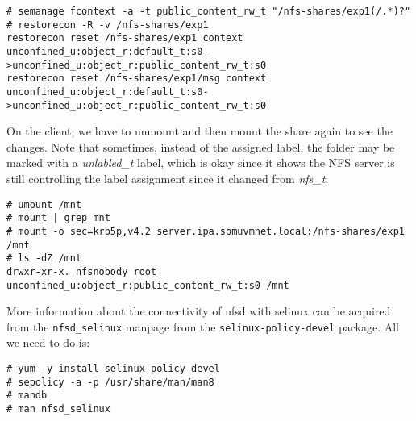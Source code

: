 \vspace{-15pt}
\begin{verbatim}
# semanage fcontext -a -t public_content_rw_t "/nfs-shares/exp1(/.*)?"
# restorecon -R -v /nfs-shares/exp1
restorecon reset /nfs-shares/exp1 context unconfined_u:object_r:default_t:s0->unconfined_u:object_r:public_content_rw_t:s0
restorecon reset /nfs-shares/exp1/msg context unconfined_u:object_r:default_t:s0->unconfined_u:object_r:public_content_rw_t:s0
\end{verbatim}
\vspace{-10pt}	

\noindent
On the client, we have to unmount and then mount the share again to see the changes. Note that sometimes, instead of the assigned label, the folder may be marked with a \textit{unlabled\_t} label, which is okay since it shows the NFS server is still controlling the label assignment since it changed from \textit{nfs\_t}:

\vspace{-15pt}
\begin{verbatim}
# umount /mnt
# mount | grep mnt
# mount -o sec=krb5p,v4.2 server.ipa.somuvmnet.local:/nfs-shares/exp1 /mnt
# ls -dZ /mnt
drwxr-xr-x. nfsnobody root unconfined_u:object_r:public_content_rw_t:s0 /mnt
\end{verbatim}
\vspace{-10pt}	

\noindent
More information about the connectivity of nfsd with selinux can be acquired from the \verb|nfsd_selinux| manpage from the \verb|selinux-policy-devel| package. All we need to do is:

\vspace{-15pt}
\begin{verbatim}
# yum -y install selinux-policy-devel
# sepolicy -a -p /usr/share/man/man8
# mandb
# man nfsd_selinux
\end{verbatim}
\vspace{-10pt}	
